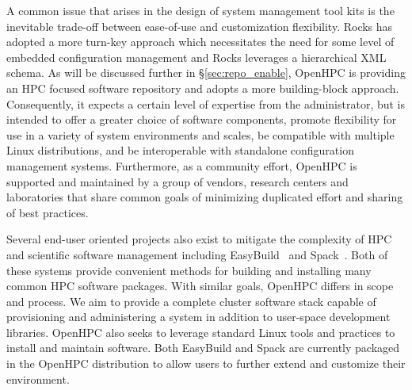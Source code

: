 A common issue that arises in the design of system management tool kits is the
inevitable trade-off between ease-of-use and customization flexibility. Rocks
has adopted a more turn-key approach which necessitates the need for some level
of embedded configuration management and Rocks leverages a hierarchical XML
schema. As will be discussed further in \S\ref{sec:repo_enable}, OpenHPC is
providing an HPC focused software repository and adopts a more building-block
approach. Consequently, it expects a certain level of expertise from the
administrator, but is intended to offer a greater choice of software
components, promote flexibility for use in a variety of system environments
and scales, be compatible with multiple Linux distributions, and be
interoperable with standalone configuration management systems.
Furthermore, as
a community effort, OpenHPC is supported and maintained by a group of vendors,
research centers and laboratories that share common goals of minimizing
duplicated effort and sharing of best practices.

Several end-user oriented projects also exist to mitigate the complexity of HPC
and scientific software management including EasyBuild~\cite{easybuild2012} and
Spack~\cite{spack2015}.  Both of these systems provide convenient methods for
building and installing many common HPC software packages. With similar goals,
OpenHPC differs in scope and process. We aim to provide a complete cluster
software stack capable of provisioning and administering a system in addition
to user-space development libraries. OpenHPC also seeks to leverage standard
Linux tools and practices to install and maintain software. Both EasyBuild and
Spack are currently packaged in the OpenHPC distribution to allow users to
further extend and customize their environment.
